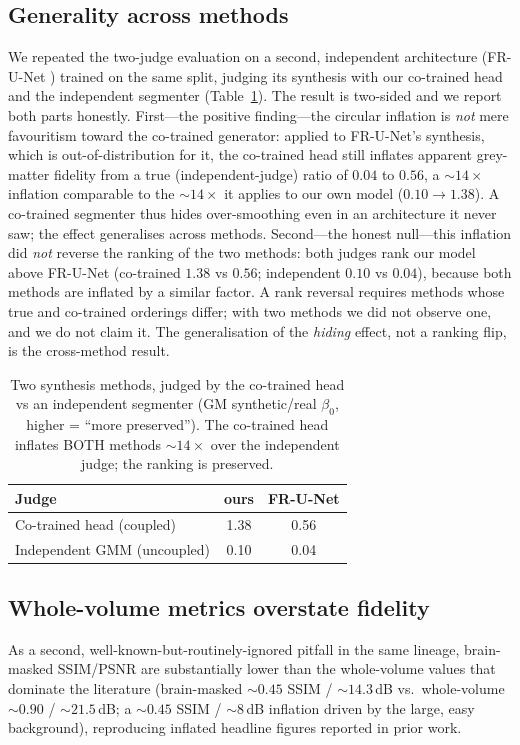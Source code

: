 \documentclass[11pt,a4paper]{article}
\begin{document}
\subsection{Generality across methods}\label{sec:generality}
We repeated the two-judge evaluation on a second, independent architecture (FR-U-Net
\cite{acs2025semisupervised}) trained on the same split, judging its synthesis with our co-trained
head and the independent segmenter (Table~\ref{tab:cross}). The result is two-sided and we report
both parts honestly. First---the positive finding---the circular inflation is \emph{not} mere
favouritism toward the co-trained generator: applied to FR-U-Net's synthesis, which is
out-of-distribution for it, the co-trained head still inflates apparent grey-matter fidelity from a
true (independent-judge) ratio of $0.04$ to $0.56$, a ${\sim}14\times$ inflation comparable to the
${\sim}14\times$ it applies to our own model ($0.10 \rightarrow 1.38$). A co-trained segmenter thus
hides over-smoothing even in an architecture it never saw; the effect generalises across methods.
Second---the honest null---this inflation did \emph{not} reverse the ranking of the two methods:
both judges rank our model above FR-U-Net (co-trained $1.38$ vs $0.56$; independent $0.10$ vs
$0.04$), because both methods are inflated by a similar factor. A rank reversal requires methods
whose true and co-trained orderings differ; with two methods we did not observe one, and we do not
claim it. The generalisation of the \emph{hiding} effect, not a ranking flip, is the cross-method
result.

\begin{table}[t]\centering
\caption{Two synthesis methods, judged by the co-trained head vs an independent segmenter
(GM synthetic/real $\beta_0$, higher = ``more preserved''). The co-trained head inflates BOTH
methods ${\sim}14\times$ over the independent judge; the ranking is preserved.}\label{tab:cross}
\begin{tabular}{lcc}
\toprule
Judge & ours & FR-U-Net \\
\midrule
Co-trained head (coupled)   & 1.38 & 0.56 \\
Independent GMM (uncoupled) & 0.10 & 0.04 \\
\bottomrule
\end{tabular}
\end{table}

\subsection{Whole-volume metrics overstate fidelity}\label{sec:inflation}
As a second, well-known-but-routinely-ignored pitfall in the same lineage, brain-masked SSIM/PSNR
are substantially lower than the whole-volume values that dominate the literature
(brain-masked ${\sim}0.45$ SSIM / ${\sim}14.3$\,dB vs.\ whole-volume ${\sim}0.90$ / ${\sim}21.5$\,dB;
a ${\sim}0.45$ SSIM / ${\sim}8$\,dB inflation driven by the large, easy background), reproducing
inflated headline figures reported in prior work.
\end{document}
